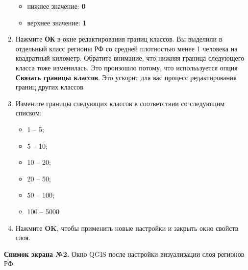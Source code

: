 \documentclass[
  12pt,
]{book}
\providecommand{\tightlist}{%
  \setlength{\itemsep}{0pt}\setlength{\parskip}{0pt}}
\begin{document}
\begin{enumerate}
  \begin{itemize}
  \tightlist
  \item
    нижнее значение: \textbf{0}
  \item
    верхнее значение: \textbf{1}
  \end{itemize}
\item
  Нажмите \textbf{ОК} в окне редактирования границ классов. Вы выделили в отдельный класс регионы РФ со средней плотностью менее 1 человека на квадратный километр. Обратите внимание, что нижняя граница следующего класса тоже изменилась. Это произошло потому, что исполььзуется опция \textbf{Связать границы классов}. Это ускорит для вас процесс редактирования границ других классов
\item
  Измените границы следующих классов в соответствии со следующим списком:

  \begin{itemize}
  \tightlist
  \item
    1 -- 5;
  \item
    5 -- 10;
  \item
    10 -- 20;
  \item
    20 -- 50;
  \item
    50 -- 100;
  \item
    100 -- 5000
  \end{itemize}
\item
  Нажмите \textbf{OK}, чтобы применить новые настройки и закрыть окно свойств слоя.
\end{enumerate}

\textbf{Снимок экрана №2.} Окно QGIS после настройки визуализации слоя регионов РФ
\end{document}
